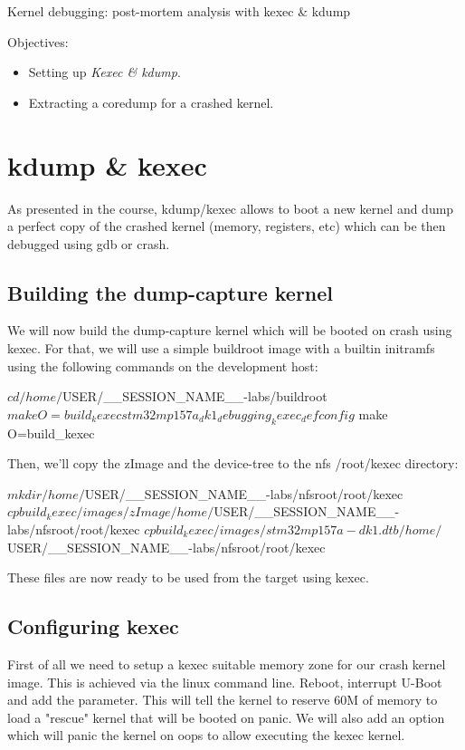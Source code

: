 \subchapter
{Kernel debugging: post-mortem analysis with kexec \& kdump}
{Objectives:
  \begin{itemize}
	  \item Setting up {\em Kexec \& kdump}.
	  \item Extracting a coredump for a crashed kernel.
  \end{itemize}
}

\section{kdump \& kexec}

As presented in the course, kdump/kexec allows to boot a new kernel and dump a
perfect copy of the crashed kernel (memory, registers, etc) which can be then
debugged using gdb or crash. 

\subsection{Building the dump-capture kernel}

We will now build the dump-capture kernel which will be booted on crash using
kexec. For that, we will use a simple buildroot image with a builtin initramfs
using the following commands on the development host:

\begin{bashinput}
$ cd /home/$USER/__SESSION_NAME__-labs/buildroot
$ make O=build_kexec stm32mp157a_dk1_debugging_kexec_defconfig
$ make O=build_kexec
\end{bashinput}

Then, we'll copy the zImage and the device-tree to the nfs /root/kexec
directory:

\begin{bashinput}
$ mkdir /home/$USER/__SESSION_NAME__-labs/nfsroot/root/kexec
$ cp build_kexec/images/zImage /home/$USER/__SESSION_NAME__-labs/nfsroot/root/kexec
$ cp build_kexec/images/stm32mp157a-dk1.dtb /home/$USER/__SESSION_NAME__-labs/nfsroot/root/kexec
\end{bashinput}

These files are now ready to be used from the target using kexec.

\subsection{Configuring kexec}

First of all we need to setup a kexec suitable memory zone for our crash kernel
image. This is achieved via the linux command line. Reboot, interrupt U-Boot and
add the  parameter. This will tell the kernel to reserve
60M of memory to load a "rescue" kernel that will be booted on panic. We will
also add an option which will panic the kernel on oops to allow executing the
kexec kernel.

